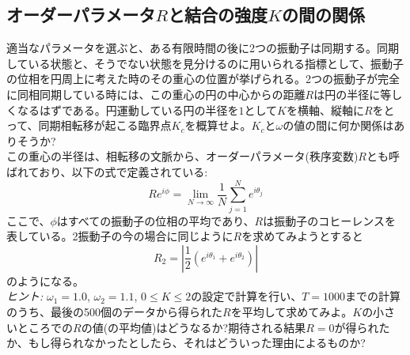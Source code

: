 \documentclass{jsarticle}
\begin{document}
\subsection{オーダーパラメータ$R$と結合の強度$K$の間の関係}
    適当なパラメータを選ぶと、ある有限時間の後に2つの振動子は同期する。同期している状態と、そうでない状態を見分けるのに用いられる指標として、振動子の位相を円周上に考えた時のその重心の位置が挙げられる。2つの振動子が完全に同相同期している時には、この重心の円の中心からの距離$R$は円の半径に等しくなるはずである。円運動している円の半径を$1$として$K$を横軸、縦軸に$R$をとって、同期相転移が起こる臨界点$K_{c}$を概算せよ。$K_{c}$と$\omega$の値の間に何か関係はありそうか?\\
    この重心の半径は、相転移の文脈から、オーダーパラメータ(秩序変数)$R$とも呼ばれており、以下の式で定義されている:
    $$Re^{i\phi} = \lim_{N\rightarrow \infty}\frac{1}{N}\sum_{j=1}^{N} e^{i\theta_{j}}$$
    ここで、$\phi$はすべての振動子の位相の平均であり、$R$は振動子のコヒーレンスを表している。2振動子の今の場合に同じように$R$を求めてみようとすると
    $$R_{2} = \left| \frac{1}{2} (e^{i\theta_{1}} + e^{i\theta_{2}}) \right|$$
    のようになる。\\
    \emph{ヒント:} $\omega_{1} = 1.0$, $\omega_{2} = 1.1$, $0\le K \le 2$の設定で計算を行い、$T=1000$までの計算のうち、最後の500個のデータから得られた$R$を平均して求めてみよ。$K$の小さいところでの$R$の値(の平均値)はどうなるか?期待される結果$R=0$が得られたか、もし得られなかったとしたら、それはどういった理由によるものか?
\end{document}
